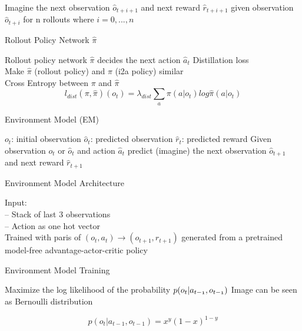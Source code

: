 Imagine the next observation $\hat{o}_{t+i+1}$ and next reward $\hat{r}_{t+i+1}$ given observation $\hat{o}_{t+i}$ for n rollouts where $i = 0, ..., n$


Rollout Policy Network $\hat{\pi}$

Rollout policy network $\hat{\pi}$ decides the next action $\hat{a}_t$
Distillation loss\\
Make $\hat{\pi}$ (rollout policy) and $\pi$ (i2a policy) similar\\
	

Cross Entropy between $\pi$ and $\hat{\pi}$\\
	\begin{equation}
		l_{dist}(\pi, \hat{\pi})(o_t) = \lambda_{dist} \sum_a \pi(a | o_t) log \hat{\pi}(a|o_t)
	\end{equation}
    


Environment Model (EM)

$o_t$: initial observation
 $\hat{o}_t$: predicted observation
 $\hat{r}_t$: predicted reward
Given observation $o_t$ or $\hat{o}_t$ and action $\hat{a}_t$ predict (imagine) the next observation $\hat{o}_{t+1}$ and next reward $\hat{r}_{t+1}$ 
	


Environment Model Architecture

 Input:\\
		-- Stack of last 3 observations\\
		-- Action as one hot vector\\
Trained with paris of $(o_t, a_t) \rightarrow (o_{t+1}, r_{t+1})$ generated from a pretrained model-free advantage-actor-critic policy
	


    Environment Model Training

Maximize the log likelihood of the probability $\mathnormal{p(o_t | a_{t-1}, o_{t-1})}$
Image can be seen as Bernoulli distribution

	\begin{equation}
	 p(o_t | a_{t-1}, o_{t-1}) = x^y (1-x)^{1-y}
	\end{equation}
	
